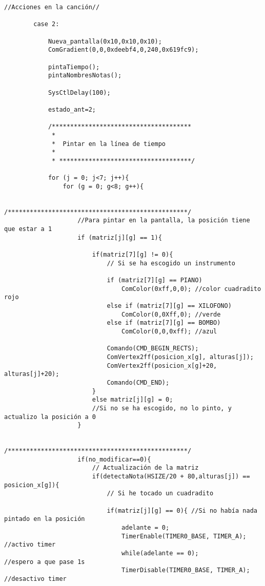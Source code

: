 \documentclass[12pt,a4paper]{article}
\begin{document}
\begin{lstlisting}[basicstyle=\footnotesize] 
            //Acciones en la canción//

        case 2:

            Nueva_pantalla(0x10,0x10,0x10);
            ComGradient(0,0,0xdeebf4,0,240,0x619fc9);

            pintaTiempo();
            pintaNombresNotas();

            SysCtlDelay(100);

            estado_ant=2;

            /**************************************
             *
             *  Pintar en la línea de tiempo
             *
             * ************************************/

            for (j = 0; j<7; j++){
                for (g = 0; g<8; g++){

                    /*************************************************/
                    //Para pintar en la pantalla, la posición tiene que estar a 1
                    if (matriz[j][g] == 1){

                        if(matriz[7][g] != 0){
                            // Si se ha escogido un instrumento

                            if (matriz[7][g] == PIANO)
                                ComColor(0xff,0,0); //color cuadradito rojo
                            else if (matriz[7][g] == XILOFONO)
                                ComColor(0,0Xff,0); //verde
                            else if (matriz[7][g] == BOMBO)
                                ComColor(0,0,0xff); //azul

                            Comando(CMD_BEGIN_RECTS);
                            ComVertex2ff(posicion_x[g], alturas[j]);
                            ComVertex2ff(posicion_x[g]+20, alturas[j]+20);
                            Comando(CMD_END);
                        }
                        else matriz[j][g] = 0;
                        //Si no se ha escogido, no lo pinto, y actualizo la posición a 0
                    }

                    /*************************************************/
                    if(no_modificar==0){
                        // Actualización de la matriz
                        if(detectaNota(HSIZE/20 + 80,alturas[j]) == posicion_x[g]){
                            // Si he tocado un cuadradito

                            if(matriz[j][g] == 0){ //Si no había nada pintado en la posición
                                adelante = 0;
                                TimerEnable(TIMER0_BASE, TIMER_A);  //activo timer
                                while(adelante == 0);               //espero a que pase 1s
                                TimerDisable(TIMER0_BASE, TIMER_A); //desactivo timer


\end{lstlisting}
\end{document}
